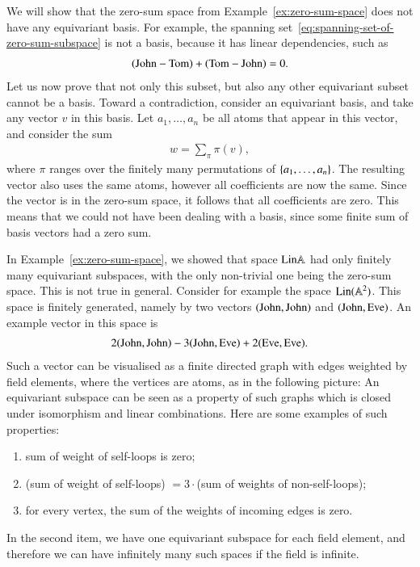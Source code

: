 \begin{myexample}\label{ex:no-equivariant-basis}
    We will show that the zero-sum space from Example~\ref{ex:zero-sum-space} does not have any equivariant basis. 
    For example, the spanning set~\eqref{eq:spanning-set-of-zero-sum-subspace} is not a basis, because it has  linear dependencies, such as
    \begin{align*}
    (\text{John} - \text{Tom}) + (\text{Tom} - \text{John}) = 0.
    \end{align*}
    Let us now prove that not only this subset, but also any other equivariant subset cannot be a basis. Toward a contradiction, consider an equivariant basis, and take  any vector $v$ in this basis. Let $a_1,\ldots,a_n$ be all atoms that appear in this vector, and consider the sum 
    \begin{align*}
    w= \sum_\pi \pi(v),
    \end{align*}
    where $\pi$ ranges over the finitely many permutations of $\{a_1,\ldots,a_n\}$. The resulting vector also uses the same atoms, however all coefficients are now the same. Since the vector is in the zero-sum space, it follows that all coefficients are zero. This means that we could not have been dealing with a basis, since some finite sum of basis vectors had a zero sum. 
\end{myexample}

\begin{myexample}
  In Example~\ref{ex:zero-sum-space}, we showed that space $\mathrm{Lin} \mathbb A$ had only finitely many equivariant subspaces, with the only non-trivial one being the zero-sum space. This is not true in general. Consider for example the space $\mathrm{Lin}(\mathbb A^2)$. This space is finitely generated, namely by two vectors $(\text{John},\text{John})$ and $(\text{John},\text{Eve})$.
  An example vector in this space is 
  \begin{align*}
  2(\text{John},\text{John})  - 3(\text{John}, \text{Eve}) + 2(\text{Eve},\text{Eve}).
  \end{align*}
  Such a vector can be visualised as a  finite directed graph with edges weighted by field elements, where the vertices are atoms, as in the following picture:
  An equivariant subspace can be seen as a property of such graphs which is closed under isomorphism and linear combinations. Here are some examples of such properties:
  \begin{enumerate}
    \item sum of  weight of self-loops is zero;
    \item (sum of weight of self-loops) $=3 \cdot$(sum of weights of non-self-loops);
    \item for every vertex, the sum of the weights of incoming edges is zero.
  \end{enumerate}
  In the second item, we have one equivariant subspace for each field element, and therefore we can have infinitely many such spaces if the field is infinite.
\end{myexample}

